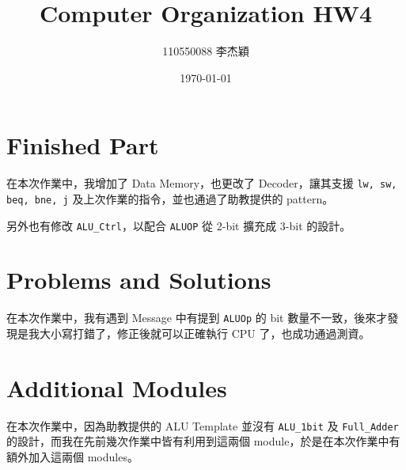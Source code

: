 \documentclass[twocolumn]{extarticle}
\title{Computer Organization HW4}
\author{110550088 李杰穎}
\date{\today}
\begin{document}
\maketitle



\section{Finished Part}

在本次作業中，我增加了 Data Memory，也更改了 Decoder，讓其支援 \texttt{lw, sw, beq, bne, j} 及上次作業的指令，並也通過了助教提供的 pattern。

另外也有修改 \texttt{ALU\_Ctrl}，以配合 \texttt{ALUOP} 從 2-bit 擴充成 3-bit 的設計。

\section{Problems and Solutions}

在本次作業中，我有遇到 Message 中有提到 \texttt{ALUOp} 的 bit 數量不一致，後來才發現是我大小寫打錯了，修正後就可以正確執行 CPU 了，也成功通過測資。

\section{Additional Modules}

在本次作業中，因為助教提供的 ALU Template 並沒有 \texttt{ALU\_1bit} 及 \texttt{Full\_Adder} 的設計，而我在先前幾次作業中皆有利用到這兩個 module，於是在本次作業中有額外加入這兩個 modules。
\end{document}
